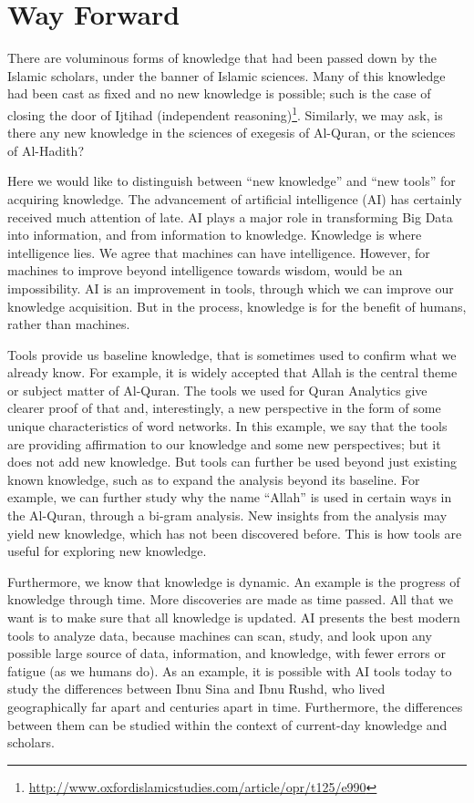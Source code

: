 \documentclass[
]{article}
\begin{document}
\normalsize

\hypertarget{way-forward}{%
\section{Way Forward}\label{way-forward}}

There are voluminous forms of knowledge that had been passed down by the Islamic scholars, under the banner of Islamic sciences. Many of this knowledge had been cast as fixed and no new knowledge is possible; such is the case of closing the door of Ijtihad (independent reasoning)\footnote{\url{http://www.oxfordislamicstudies.com/article/opr/t125/e990}}. Similarly, we may ask, is there any new knowledge in the sciences of exegesis of Al-Quran, or the sciences of Al-Hadith?

Here we would like to distinguish between ``new knowledge'' and ``new tools'' for acquiring knowledge. The advancement of artificial intelligence (AI) has certainly received much attention of late. AI plays a major role in transforming Big Data into information, and from information to knowledge. Knowledge is where intelligence lies. We agree that machines can have intelligence. However, for machines to improve beyond intelligence towards wisdom, would be an impossibility. AI is an improvement in tools, through which we can improve our knowledge acquisition. But in the process, knowledge is for the benefit of humans, rather than machines.

Tools provide us baseline knowledge, that is sometimes used to confirm what we already know. For example, it is widely accepted that Allah is the central theme or subject matter of Al-Quran. The tools we used for Quran Analytics give clearer proof of that and, interestingly, a new perspective in the form of some unique characteristics of word networks. In this example, we say that the tools are providing affirmation to our knowledge and some new perspectives; but it does not add new knowledge. But tools can further be used beyond just existing known knowledge, such as to expand the analysis beyond its baseline. For example, we can further study why the name ``Allah'' is used in certain ways in the Al-Quran, through a bi-gram analysis. New insights from the analysis may yield new knowledge, which has not been discovered before. This is how tools are useful for exploring new knowledge.

Furthermore, we know that knowledge is dynamic. An example is the progress of knowledge through time. More discoveries are made as time passed. All that we want is to make sure that all knowledge is updated. AI presents the best modern tools to analyze data, because machines can scan, study, and look upon any possible large source of data, information, and knowledge, with fewer errors or fatigue (as we humans do). As an example, it is possible with AI tools today to study the differences between Ibnu Sina and Ibnu Rushd, who lived geographically far apart and centuries apart in time. Furthermore, the differences between them can be studied within the context of current-day knowledge and scholars.
\end{document}
